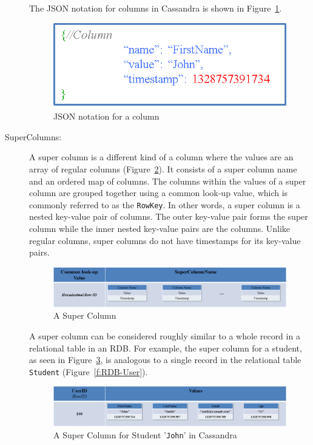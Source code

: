 \begin{description}
The JSON notation for  columns in Cassandra is shown in Figure~\ref{f:column-JSON}. 

\begin{figure}[H]
	\centering
	\includegraphics[width=.4\textwidth]{./figure/Example/Column_JSON.png}
	\caption{JSON notation for a column}\label{f:column-JSON}
\end{figure}
% 

\item [SuperColumns:] A super column is a different kind of a column where the
values are an array of regular columns (Figure~\ref{f:supercolumn}).  It consists of a super
column name and an ordered map of columns.  The columns within the values of a
super column are grouped together using a common look-up value,   which is
commonly referred to as the \texttt{RowKey}.  In other words,   a super column is a
nested key-value pair of columns.  The outer key-value pair forms the super column while the inner
nested key-value pairs are the columns.  Unlike regular columns,   super columns do
not have timestamps for its key-value pairs.  

\begin{figure}[H]
	\centering
	\includegraphics[width=.8\textwidth]{./figure/Example/SuperColumn.png}
	\caption{A Super Column }\label{f:supercolumn}
\end{figure}

A super column can be considered roughly similar to a whole record in a
relational table in an \ac{RDB}. For example,   the super column for a
student,   as seen in Figure~\ref{f:supercolumn-John},   is analogous to a single
record in the relational table \texttt{Student} (Figure~\ref{f:RDB-User}). 

\begin{figure}[H]
	\centering
	\includegraphics[width=.8\textwidth]{./figure/Example/SuperColumn_John.png}
	\caption{A Super Column for Student '\texttt{John}' in
	Cassandra}\label{f:supercolumn-John}
\end{figure}


\end{description}
